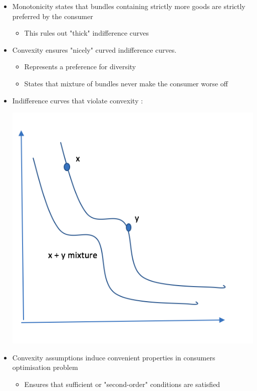 \documentclass[twoside]{article}
\begin{document}
\begin{itemize}
\item Monotonicity states that bundles containing strictly more goods are strictly preferred by the consumer
\begin{itemize}
\item This rules out "thick" indifference curves
\end{itemize}
\item Convexity ensures "nicely" curved indifference curves. 
\begin{itemize}
\item Represents a preference for diversity
\item States that mixture of bundles never make the consumer worse off
\end{itemize}
\item Indifference curves that violate convexity : 
\begin{center}
\includegraphics[scale=0.35]{7}
\end{center}
\item Convexity assumptions induce convenient properties in consumers optimisation problem 
\begin{itemize}
\item Ensures that sufficient or "second-order" conditions are satisfied
\end{itemize}
\end{itemize}
\end{document}

